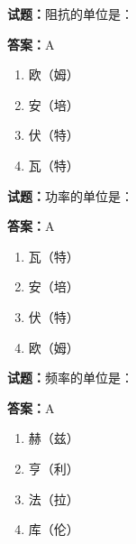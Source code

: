 \documentclass{ctexbook}
\begin{document}




\vspace{1em}

\textbf{试题：}阻抗的单位是： 

\textbf{答案：}A 


\begin{enumerate}[leftmargin=3em]
  \item 欧（姆） 

  \item 安（培） 

  \item 伏（特） 

  \item 瓦（特） 

\end{enumerate}





\vspace{1em}

\textbf{试题：}功率的单位是： 

\textbf{答案：}A 

\begin{enumerate}[leftmargin=3em]
  \item 瓦（特） 

  \item 安（培） 

  \item 伏（特） 

  \item 欧（姆） 

\end{enumerate}





\vspace{1em}

\textbf{试题：}频率的单位是： 

\textbf{答案：}A 

\begin{enumerate}[leftmargin=3em]
  \item 赫（兹） 

  \item 亨（利） 

  \item 法（拉） 

  \item 库（伦） 

\end{enumerate}
\end{document}
